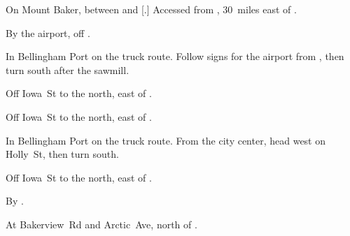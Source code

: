 
\begin{LocationList}

On Mount Baker,
between  and [.]
Accessed from , 30~miles east of .

By the airport, off  .

In Bellingham Port on the truck route.
Follow signs for the airport from  , then turn south after the sawmill.

Off Iowa~St to the north, east of  .

\Location{\RecruitmentAgency \Recruitment}
Off Iowa~St to the north, east of  .

In Bellingham Port on the truck route.
From the city center, head west on Holly~St, then turn south.

Off Iowa~St to the north, east of  .

\Location{\TruckStop \Gas \Rest}
By  .

At Bakerview~Rd and Arctic~Ave, north of  .

\end{LocationList}
